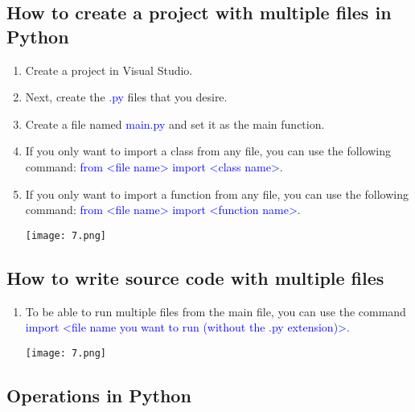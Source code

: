 \documentclass[12pt]{scrartcl}
\begin{document}
\subsection{How to create a project with multiple files in Python}

\begin{enumerate}
    \item Create a project in Visual Studio.
    \item Next, create the \textcolor{blue}{.py} files that you desire.
    \item Create a file named \textcolor{blue}{main.py} and set it as the main function.
    \item If you only want to import a class from any file, you can use the following command: \textcolor{blue}{from <file name> import <class name>}.
    \item If you only want to import a function from any file, you can use the following command: \textcolor{blue}{from <file name> import <function name>}.
        \begin{center}
            \texttt{[image: 7.png]}
        \end{center}
\end{enumerate}



\newpage

\subsection{How to write source code with multiple files}

\begin{enumerate}
     \item To be able to run multiple files from the main file, you can use the command \textcolor{blue}{import <file name you want to run (without the .py extension)>}.
        \begin{center}
            \texttt{[image: 7.png]}
        \end{center}
    
\end{enumerate}


\newpage

\subsection{Operations in Python}
\end{document}
